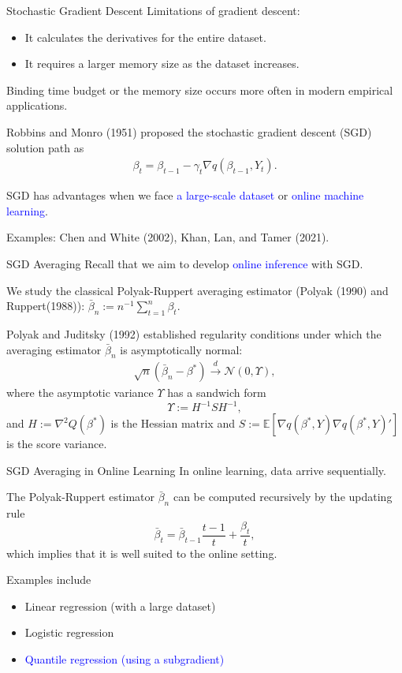 \documentclass[beamer, t]{beamer}
\newcommand{\eqs}[1]{\begin{align*}#1\end{align*}}
\newcommand{\bit}{\begin{itemize}}
\newcommand{\eit}{\end{itemize}}
\newcommand{\tcb}{\textcolor{blue}}
\begin{document}
\begin{frame}{Stochastic Gradient Descent}
Limitations of gradient descent:
\bit
    \item It calculates the derivatives for the entire dataset.
    \item It requires a larger memory size as the dataset increases.
\eit
Binding time budget or the memory size occurs more often in modern empirical applications. 
\bigskip

Robbins and Monro (1951) proposed the stochastic gradient descent (SGD) solution path as
        \eqs{
            \beta_{t}=\beta_{t-1}-\gamma_{t}\nabla q\left(\beta_{t-1},Y_{t}\right).
        }

SGD has advantages when we face \tcb{a large-scale dataset} or \tcb{online machine learning}.

Examples: Chen and White (2002), Khan, Lan, and Tamer (2021). 
\end{frame}




\begin{frame}{SGD Averaging}
Recall that we aim to develop \tcb{online inference} with SGD. 
\bigskip

We study the classical Polyak-Ruppert averaging estimator (Polyak (1990) and Ruppert(1988)):
$\bar{\beta}_{n}:=n^{-1}\sum_{t=1}^{n}\beta_{t}$.
\medskip

Polyak and Juditsky (1992)
established regularity conditions under which
the averaging estimator $\bar{\beta}_{n}$ is asymptotically normal:
\begin{align*}
\sqrt{n}\left(\bar{\beta}_{n}-\beta^{*}\right)\overset{d}{\to}
\mathcal{N} (0, \Upsilon),
\end{align*}
where the asymptotic variance $\Upsilon$ has a sandwich form $$\Upsilon := H^{-1}S H^{-1},$$ and
$H := \nabla^{2}Q\left(\beta^{*}\right)$ is the Hessian matrix
and $S := \mathbb{E} \left[\nabla q\left(\beta^{*},Y\right)\nabla q\left(\beta^{*},Y\right)'\right]$ is the score variance.
\end{frame}


\begin{frame}{SGD Averaging in Online Learning}
In online learning, data arrive sequentially.
\bigskip


The  Polyak-Ruppert estimator $\bar{\beta}_{n}$ can be computed recursively
by the updating rule $$\bar{\beta}_{t}=\bar{\beta}_{t-1}\frac{t-1}{t}+\frac{\beta_{t}}{t},$$
which implies that it is well suited to the online setting.

\bigskip

Examples include
\bit
    \item Linear regression (with a large dataset)
    \item Logistic regression
    \item \tcb{Quantile regression (using a subgradient)}
\eit
\end{frame}
\end{document}
